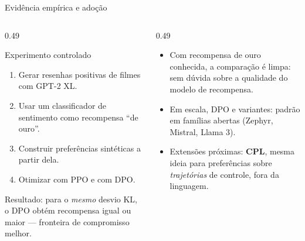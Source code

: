 \documentclass[aspectratio=169, 11pt]{beamer}
\begin{document}
\begin{frame}{Evidência empírica e adoção}

  \begin{columns}[T]
  \begin{column}{0.49\textwidth}
    \begin{defbox}{Experimento controlado}
      \begin{enumerate}\setlength{\itemsep}{0ex}
        \item Gerar resenhas positivas de filmes com GPT-2 XL.
        \item Usar um classificador de sentimento como recompensa ``de ouro''.
        \item Construir preferências sintéticas a partir dela.
        \item Otimizar com PPO e com DPO.
      \end{enumerate}
      Resultado: para o \emph{mesmo} desvio KL, o DPO obtém recompensa igual ou
      maior --- fronteira de compromisso melhor.
    \end{defbox}
  \end{column}
  \begin{column}{0.49\textwidth}
    \begin{itemize}\setlength{\itemsep}{0.3ex}
      \item Com recompensa de ouro conhecida, a comparação é limpa: sem dúvida
        sobre a qualidade do modelo de recompensa.
      \item Em escala, DPO e variantes: padrão em famílias abertas (Zephyr,
        Mistral, Llama 3).
      \item Extensões próximas: \textbf{CPL}, mesma ideia para preferências
        sobre \emph{trajetórias} de controle, fora da linguagem.
    \end{itemize}
  \end{column}
  \end{columns}
\end{frame}
\end{document}
